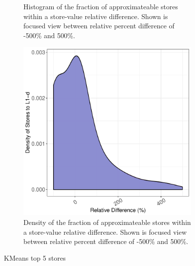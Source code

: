 \begin{figure}[htbp]
\begin{subfigure}{0.33\textwidth}
		\caption{Histogram of the fraction of approximateable stores within a store-value relative difference. Shown is focused view between relative percent difference of -500\% and 500\%.}
	\end{subfigure}
	\begin{subfigure}{0.33\textwidth}
		\centering
		\includegraphics[scale=0.4]{graphs/kmeans_top5/narrow_dist.pdf}
		\caption{Density of the fraction of approximateable stores within a store-value relative difference. Shown is focused view between relative percent difference of -500\% and 500\%.}
	\end{subfigure}
\caption{KMeans top 5 stores} %
\label{fig:kmeans_valsim_top5}
\end{figure}



